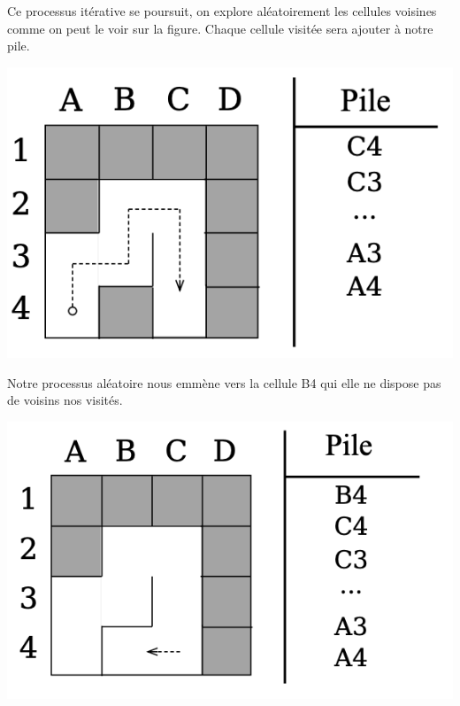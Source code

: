 \newpage

\begin{minipage}{0.6\textwidth}
Ce processus itérative se poursuit, on explore aléatoirement les cellules voisines comme on peut le voir sur la figure. Chaque cellule visitée sera ajouter à notre pile.
\end{minipage}
\begin{minipage}{0.4\textwidth}
\includegraphics[width=\linewidth]{report/pics/backtracking3.png}
\end{minipage}



\begin{minipage}{0.6\textwidth}
Notre processus aléatoire nous emmène vers la cellule B4 qui elle ne dispose pas de voisins nos visités.
\end{minipage}
\begin{minipage}{0.4\textwidth}
\includegraphics[width=\linewidth]{report/pics/backtracking4.png}
\end{minipage}


